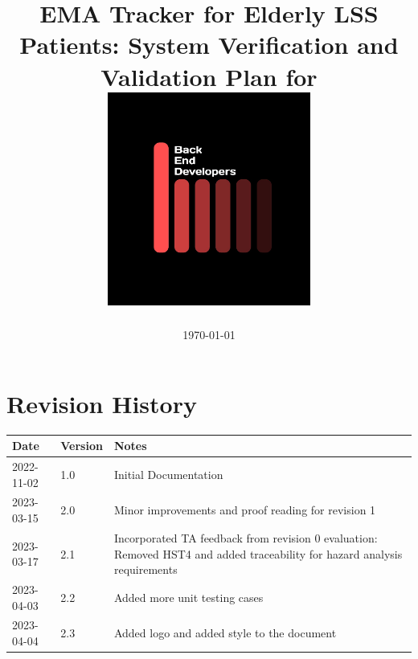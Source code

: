 \documentclass[12pt, titlepage]{article}
\begin{document}
\title{\textbf{EMA Tracker for Elderly LSS Patients: System Verification and Validation Plan for \progname{}} \\ \vspace{2cm}\includegraphics[width=0.5\textwidth]{../logo.jpg}}
 \pagecolor{black}\afterpage{\nopagecolor}

\author{\authname}
\date{\today}

\color{white}\maketitle
\color{black}

\section{Revision History}

\begin{tabularx}{\textwidth}{p{2.2cm}p{1.6cm}X}

  \toprule {\bf Date} & {\bf Version} & {\bf Notes}           \\
  \midrule
  2022-11-02 & 1.0 & Initial Documentation \\
  2023-03-15 & 2.0 &  Minor improvements and proof reading for revision 1 \\
  2023-03-17 & 2.1 & Incorporated TA feedback from revision 0 evaluation: Removed HST4 and added traceability for hazard analysis requirements \\
2023-04-03 & 2.2 & Added more unit testing cases \\
2023-04-04 & 2.3 & Added logo and added style to the document \\
  \bottomrule
\end{tabularx}

\newpage

\tableofcontents
\end{document}
